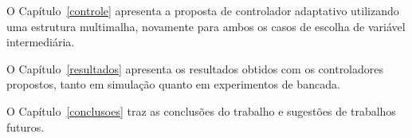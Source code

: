 	O Capítulo~\ref{controle} apresenta a proposta de controlador adaptativo utilizando uma estrutura multimalha, novamente para ambos os casos de escolha de variável intermediária.

	O Capítulo~\ref{resultados} apresenta os resultados obtidos com os controladores propostos, tanto em simulação quanto em experimentos de bancada.

	O Capítulo~\ref{conclusoes} traz as conclusões do trabalho e sugestões de trabalhos futuros.

